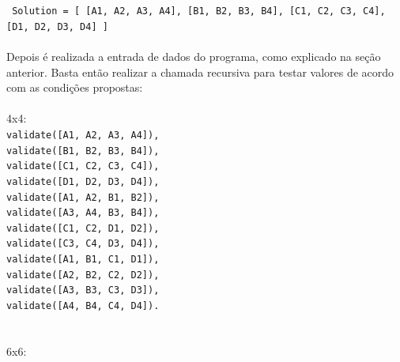 \documentclass{article}
\begin{document}
\texttt{ Solution = [
        [A1, A2, A3, A4],
        [B1, B2, B3, B4],
        [C1, C2, C3, C4],
        [D1, D2, D3, D4]
    ]}
\\
\\
Depois é realizada a entrada de dados do programa, como explicado na seção anterior. Basta então realizar a chamada recursiva para testar valores de acordo com as condições propostas:
\\
\\
4x4:
\\
\texttt{validate([A1, A2, A3, A4]),\\
      validate([B1, B2, B3, B4]),\\
      validate([C1, C2, C3, C4]),\\
      validate([D1, D2, D3, D4]),\\
      validate([A1, A2, B1, B2]),\\
      validate([A3, A4, B3, B4]),\\
      validate([C1, C2, D1, D2]),\\
      validate([C3, C4, D3, D4]),\\
      validate([A1, B1, C1, D1]),\\
      validate([A2, B2, C2, D2]),\\
      validate([A3, B3, C3, D3]),\\
      validate([A4, B4, C4, D4]).}
\\
\\
\\
6x6:
\end{document}
